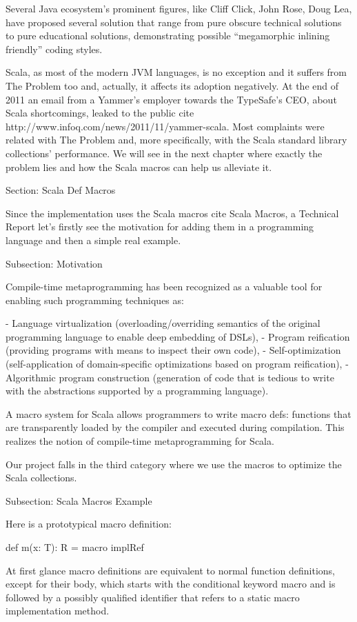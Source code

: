 Several Java ecosystem's prominent figures, like Cliff Click, John Rose, Doug
Lea, have proposed several solution that range from pure obscure technical
solutions to pure educational solutions, demonstrating possible ``megamorphic
inlining friendly'' coding styles.

Scala, as most of the modern JVM languages, is no exception and it suffers from
The Problem too and, actually, it affects its adoption negatively. At the end of
2011 an email from a Yammer's employer towards the TypeSafe's CEO, about Scala
shortcomings, leaked to the public {cite
http://www.infoq.com/news/2011/11/yammer-scala}. Most complaints were related
with The Problem and, more specifically, with the Scala standard
library collections' performance. We will see in the next chapter where exactly
the problem lies and how the Scala macros can help us alleviate it.


Section: Scala Def Macros

Since the implementation uses the Scala macros {cite Scala Macros, a Technical
Report} let's firstly see the motivation for adding them in a programming
language and then a simple real example.


Subsection: Motivation

Compile-time metaprogramming has been recognized as a valuable tool for enabling
such programming techniques as:

- Language virtualization (overloading/overriding semantics of the original
programming language to enable deep embedding of DSLs),
- Program reification (providing programs with means to inspect their own code),
- Self-optimization (self-application of domain-specific optimizations based on
program reification),
- Algorithmic program construction (generation of code that is tedious to write
with the abstractions supported by a programming language).

A macro system for Scala allows programmers to write macro defs: functions that
are transparently loaded by the compiler and executed during compilation. This
realizes the notion of compile-time metaprogramming for Scala.

Our project falls in the third category where we use the macros to optimize the
Scala collections.


Subsection: Scala Macros Example

Here is a prototypical macro definition:

def m(x: T): R = macro implRef

At first glance macro definitions are equivalent to normal function definitions,
except for their body, which starts with the conditional keyword macro and is
followed by a possibly qualified identifier that refers to a static macro
implementation method.

